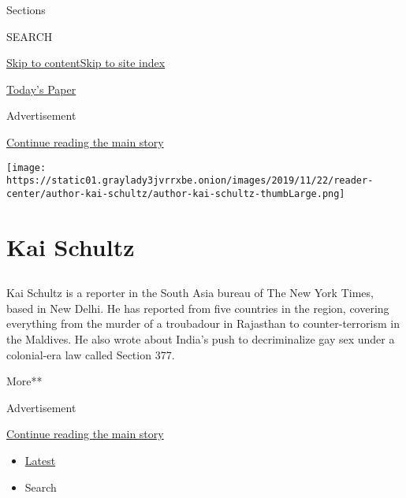 Sections

SEARCH

\protect\hyperlink{site-content}{Skip to
content}\protect\hyperlink{site-index}{Skip to site index}

\href{https://myaccount.nytimes3xbfgragh.onion/auth/login?response_type=cookie\&client_id=vi}{}

\href{https://www.nytimes3xbfgragh.onion/section/todayspaper}{Today's
Paper}

Advertisement

\protect\hyperlink{after-top}{Continue reading the main story}

\texttt{[image: https://static01.graylady3jvrrxbe.onion/images/2019/11/22/reader-center/author-kai-schultz/author-kai-schultz-thumbLarge.png]}

\hypertarget{kai-schultz}{%
\section{Kai Schultz}\label{kai-schultz}}

\subsection{}

Kai Schultz is a reporter in the South Asia bureau of The New York
Times, based in New Delhi. He has reported from five countries in the
region, covering everything from the murder of a troubadour in Rajasthan
to counter-terrorism in the Maldives. He also wrote about India's push
to decriminalize gay sex under a colonial-era law called Section 377.

More**

Advertisement

\protect\hyperlink{after-mid1}{Continue reading the main story}

\begin{itemize}
\tightlist
\item
  \protect\hyperlink{stream-panel}{Latest}
\item
  Search
\end{itemize}


